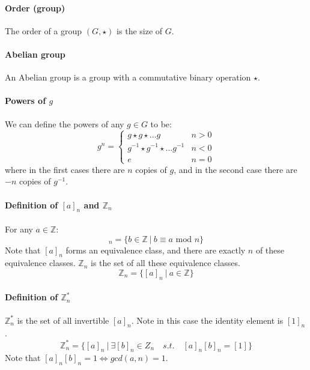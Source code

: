 \documentclass{scrartcl}
\newcommand{\Z}{\mathbb{Z}}
\begin{document}
\paragraph{Order (group)}
The order of a group $ (G, \star) $ is the size of $ G $.

\paragraph{Abelian group}
An Abelian group is a group with a commutative binary operation $ \star $.

\paragraph{Powers of $ g $}
We can define the powers of any $ g \in G $ to be:
\begin{equation}
g^{n} = 
\begin{cases}
g \star g \star ... g & n > 0 \\
g^{-1} \star g^{-1} \star ... g^{-1} & n < 0 \\
e & n = 0
\end{cases}
\end{equation}
where in the first cases there are $ n $ copies of $ g $, and in the second case there are $ -n $ copies of $ g^{-1} $.

\paragraph{Definition of $ [a]_{n} $ and $ \Z_{n} $}
For any $ a \in \Z $:
\begin{equation}
[a]_{n} = \{b \in \Z \ | \ b \equiv a \textrm{ mod } n \}
\end{equation}
Note that $ [a]_{n} $ forms an equivalence class, and there are exactly $ n $ of these equivalence classes. $ \Z_{n} $ is the set of all these equivalence classes.
\begin{equation}
\Z_{n} = \{[a]_{n} \ | \ a \in \Z \}
\end{equation}

\paragraph{Definition of $ \Z_{n}^{*} $}
$ \Z_{n}^{*} $ is the set of all invertible $ [a]_{n} $. Note in this case the identity element is $ [1]_{n} $.
\begin{equation}
\Z_{n}^{*} = \{[a]_{n} \ | \ \exists [b]_{n} \in Z_{n} \quad s.t. \quad [a]_{n}[b]_{n} = [1]\}
\end{equation}
Note that $ [a]_{n}[b]_{n} = 1 \Leftrightarrow gcd(a, n) = 1 $.
\end{document}
